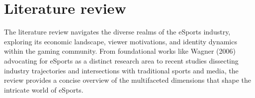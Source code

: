 \documentclass[manuscript,screen,review,anonymous]{acmart}
\begin{document}






\section{Literature review}
The literature review navigates the diverse realms of the eSports industry, exploring its economic landscape, viewer motivations, and identity dynamics within the gaming community. From foundational works like Wagner (2006) advocating for eSports as a distinct research area to recent studies dissecting industry trajectories and intersections with traditional sports and media, the review provides a concise overview of the multifaceted dimensions that shape the intricate world of eSports.
\end{document}
